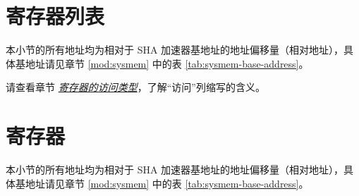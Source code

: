 \documentclass[main\_\_CN.tex]{subfiles}
\begin{document}
\clearpage
\hypertarget{sha-reg-summ}{}
\section{寄存器列表} \label{sec:sha-reg-summ} 

本小节的所有地址均为相对于 SHA 加速器基地址的地址偏移量（相对地址），具体基地址请见章节 \ref{mod:sysmem} \textit{} 中的表 \ref{tab:sysmem-base-address}。

请查看章节 \hyperref[glossary-access-types]{\textit{寄存器的访问类型}}，了解“访问”列缩写的含义。



\section{寄存器}

本小节的所有地址均为相对于 SHA 加速器基地址的地址偏移量（相对地址），具体基地址请见章节 \ref{mod:sysmem} \textit{} 中的表 \ref{tab:sysmem-base-address}。


\end{document}
